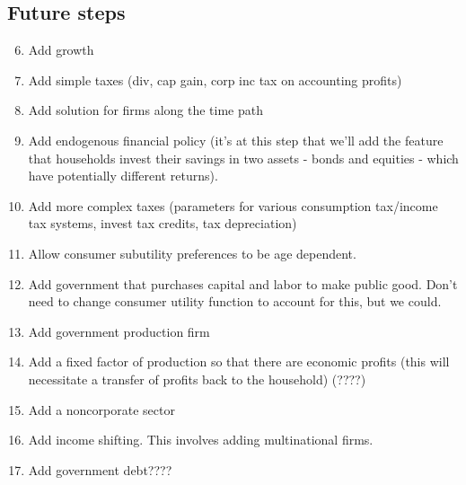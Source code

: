 \documentclass[letterpaper,12pt]{article}
\theoremstyle{definition}
\begin{document}
\begin{spacing}{1.5}
\section*{Future steps}

\begin{enumerate}
\setcounter{enumi}{5}
\item Add growth
\item Add simple taxes (div, cap gain, corp inc tax on accounting profits)
\item Add solution for firms along the time path
\item Add endogenous financial policy (it's at this step that we'll add the feature that households invest their savings in two assets - bonds and equities - which have potentially different returns).
\item Add more complex taxes (parameters for various consumption tax/income tax systems, invest tax credits, tax depreciation)
\item Allow consumer subutility preferences to be age dependent.
\item Add government that purchases capital and labor to make public good.  Don't need to change consumer utility function to account for this, but we could.
\item Add government production firm
\item Add a fixed factor of production so that there are economic profits (this will necessitate a transfer of profits back to the household) (????)
\item Add a noncorporate sector
\item Add income shifting.  This involves adding multinational firms.
\item Add government debt????
\end{enumerate}


\end{spacing}

\clearpage

%  
\end{document}
